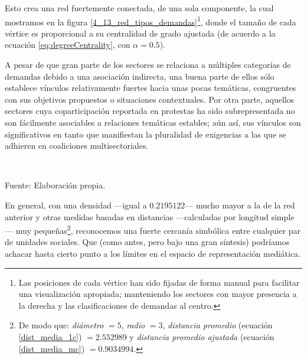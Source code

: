 \documentclass[letterpaper, 11pt]{book}
\theoremstyle{definition}
\theoremstyle{remark}
\begin{document}
Esto crea una red fuertemente conectada, de una sola componente, la cual mostramos en la figura \ref{4_13_red_tipos_demandas}\footnote{
    Las posiciones de cada vértice han sido fijadas de forma manual para facilitar una visualización apropiada; manteniendo los sectores con mayor presencia a la derecha y las clasificaciones de demandas al centro. 
}, 
donde el tamaño de cada vértice es proporcional a su centralidad de grado ajustada (de acuerdo a la ecuación \ref{eq:degreeCentrality}, con $\alpha=0.5$). 


A pesar de que gran parte de los sectores se relaciona a múltiples categorías de demandas debido a una asociación indirecta, una buena parte de ellos sólo establece vínculos relativamente fuertes hacia unas pocas temáticas, congruentes con sus objetivos propuestos o situaciones contextuales. 
Por otra parte, aquellos sectores cuya coparticipación reportada en protestas ha sido subrepresentada no son fácilmente asociables a relaciones temáticas estables; aún así, sus vínculos son significativos en tanto que manifiestan la pluralidad de exigencias a las que se adhieren en coaliciones multisectoriales. 


\begin{minipage}{\linewidth}
\centering
{} \label{4_13_red_tipos_demandas}

\includegraphics[scale=0.1]{img/null.png}
\vspace{48em}
\par\bigskip
\small Fuente: Elaboración propia.
\end{minipage}\bigskip





En general, con una densidad ---igual a $0.2195122$--- mucho mayor a la de la red anterior y otras medidas basadas en distancias ---calculadas por longitud simple--- muy pequeñas\footnote{
    De modo que: \emph{diámetro} $= 5$, \emph{radio} $= 3$, \emph{distancia promedio} (ecuación \ref{dist_media_1c}) $= 2.552989$ y \emph{distancia promedio ajustada} (ecuación \ref{dist_media_mc}) $= 0.9034994$. 
}, 
reconocemos una fuerte cercanía simbólica entre cualquier par de unidades sociales. 
Que (como antes, pero bajo una gran síntesis) podríamos achacar hasta cierto punto a los límites en el espacio de representación mediática. 
\end{document}
